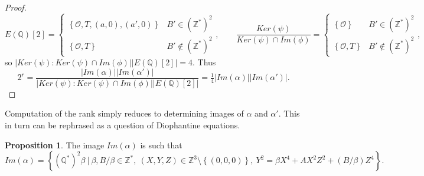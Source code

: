 \documentclass{article}
\newcommand{\Z}{\mathbb{Z}}
\newcommand{\Q}{\mathbb{Q}}
\newcommand{\rb}[1]{\left( #1 \right)}
\renewcommand{\sb}[1]{\left[ #1 \right]}
\newcommand{\cb}[1]{\left\{ #1 \right\}}
\newcommand{\abs}[1]{\left\lvert #1 \right\rvert}
\theoremstyle{definition}\newtheorem*{definition}{Definition}
\theoremstyle{definition}\newtheorem*{example}{Example}
\theoremstyle{definition}\newtheorem*{remark}{Remark}
\newtheorem{proposition}{Proposition}[subsection]
\begin{document}
\begin{proof}
$$ E\rb{\Q}\sb{2} = \begin{cases} \cb{\mathcal{O}, T, \rb{a, 0}, \rb{a', 0}} & B' \in \rb{\Z^*}^2 \\ \cb{\mathcal{O}, T} & B' \notin \rb{\Z^*}^2 \end{cases}, \qquad \dfrac{Ker\rb{\psi}}{Ker\rb{\psi} \cap Im\rb{\phi}} = \begin{cases} \cb{\mathcal{O}} & B' \in \rb{\Z^*}^2 \\ \cb{\mathcal{O}, T} & B' \notin \rb{\Z^*}^2 \end{cases}, $$
so $ \abs{Ker\rb{\psi} : Ker\rb{\psi} \cap Im\rb{\phi}}\abs{E\rb{\Q}\sb{2}} = 4 $. Thus
$$ 2^r = \dfrac{\abs{Im\rb{\alpha}}\abs{Im\rb{\alpha'}}}{\abs{Ker\rb{\psi} : Ker\rb{\psi} \cap Im\rb{\phi}}\abs{E\rb{\Q}\sb{2}}} = \tfrac{1}{4}\abs{Im\rb{\alpha}}\abs{Im\rb{\alpha'}}. $$
\end{proof}

Computation of the rank simply reduces to determining images of $ \alpha $ and $ \alpha' $. This in turn can be rephrased as a question of Diophantine equations.

\begin{proposition}
The image $ Im\rb{\alpha} $ is such that
$$ Im\rb{\alpha} = \cb{\rb{\Q^*}^2\beta \ \Big| \ \beta, B / \beta \in \Z^*, \ \rb{X, Y, Z} \in \Z^3 \setminus \cb{\rb{0, 0, 0}}, \ Y^2 = \beta X^4 + AX^2Z^2 + \rb{B / \beta}Z^4}. $$
\end{proposition}
\end{document}
